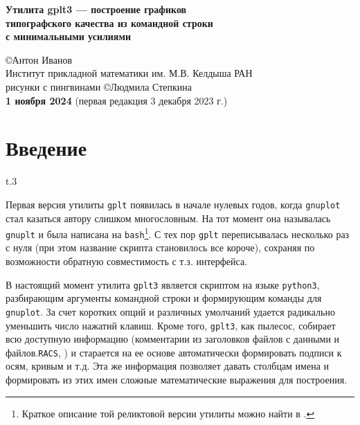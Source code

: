 \documentclass[12pt]{article}
\def\gplt{{\tt gplt}}
\def\gnuplot{{\tt gnuplot}}
\def\python{{\tt python3}}
\def\RACS{{\tt RACS}}
\begin{document}
\begin{center}
 { \Large\bf
Утилита gplt3 --- построение графиков\\ типографского качества из командной строки\\ с минимальными усилиями\\[5mm]
}

\large
\copyright Антон Иванов\\[2mm] 
\normalsize
Институт прикладной математики им. М.В. Келдыша РАН\\[2mm]

\small рисунки с пингвинами \copyright Людмила Степкина\\[3mm]
{\bf 1 ноября 2024} (первая редакция 3 декабря 2023 г.)\\[7mm]

\end{center}

\vspace{-2cm}

\tableofcontents

\newpage
\section{Введение}
\begin{wrapfigure}[5]{t}{.3\textwidth}
  \vphantom{.}
  \vspace{-1.5cm}

\end{wrapfigure}
Первая версия утилиты \gplt{} появилась в начале нулевых годов, когда \gnuplot{} стал казаться автору слишком многословным.
На тот момент она называлась \verb'gnuplt' и была написана на \verb'bash'\footnote{Краткое описание той реликтовой версии утилиты можно найти в \cite{aiv:racs2007}.}.
С тех пор \gplt{} переписывалась несколько раз с нуля (при этом название скрипта становилось все короче),
сохраняя по возможности обратную совместимость с т.з. интерфейса.  

\def\gplt{{\tt gplt3}}

В настоящий момент утилита \gplt{} является скриптом на языке \python, разбирающим аргументы командной строки и формирующим команды для \gnuplot.
За счет коротких опций и различных умолчаний удается радикально уменьшить число нажатий клавиш. Кроме того, \gplt{}, как пылесос, собирает всю доступную информацию
(комментарии из заголовков файлов с данными и файлов.\RACS, \cite{aiwlib:SR:PP2018})
и старается на ее основе автоматически формировать подписи к осям, кривым и т.д.
Эта же информация позволяет давать столбцам имена и формировать из этих имен сложные математические выражения для построения.
\end{document}
